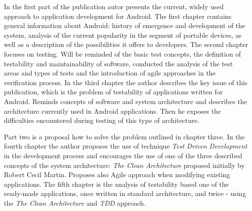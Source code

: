 In the first part of the publication autor presents the current, widely used approach to application development for Android. The first chapter contains general information about Android: history of emergence and development of the system, analysis of the current popularity in the segment of portable devices, as well as a description of the possibilities it offers to developers. The second chapter focuses on testing. Will be reminded of the basic test concepts, the definition of testability and maintainability of software, conducted the analysis of the test areas and types of tests and the introduction of agile approaches in the verification process. In the third chapter the author describes the key issue of this publication, which is the problem of testability of applications written for Android. Reminds concepts of software and system architecture and describes the architecture currently used in Android applications. Then he exposes the difficulties encountered during testing of this type of architecture.

Part two is a proposal how to solve the problem outlined in chapter three. In the fourth chapter the author proposes the use of technique \textit{Test Driven Development} in the development process and encourages the use of one of the three described concepts of the system architecture: \textit{The Clean Architecture} proposed initially by Robert Cecil Martin. Proposes also Agile approach when modifying existing applications. The fifth chapter is the analysis of testability based one of the ready-made applications, once written in standard architecture, and twice - using the \textit{The Clean Architecture} and \textit{TDD} approach.


